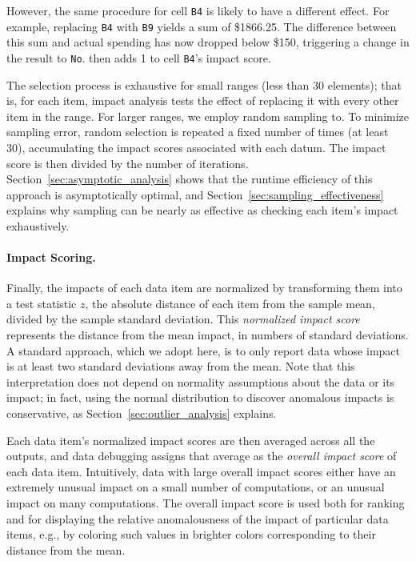 However, the same procedure for cell \texttt{B4} is likely to have a
different effect.  For example, replacing \texttt{B4}
with \texttt{B9} yields a sum of \$1866.25. The difference
between this sum and actual spending has now dropped below \$150,
triggering a change in the result to \texttt{No}. \checkcell{} then
adds 1 to cell \texttt{B4}'s impact score.


The selection process is exhaustive for small ranges (less than 30
elements); that is, for each item, impact analysis tests the effect of
replacing it with every other item in the range. For larger ranges, we
employ random sampling to.  To minimize sampling error, random
selection is repeated a fixed number of times (at least 30),
accumulating the impact scores associated with each datum. The impact
score is then divided by the number of
iterations. Section~\ref{sec:asymptotic_analysis} shows that the
runtime efficiency of this approach is asymptotically optimal, and
Section~\ref{sec:sampling_effectiveness} explains why sampling can be nearly as
effective as checking each item's impact exhaustively.

\paragraph{Impact Scoring.}
Finally, the impacts of each data item are normalized by transforming
them into a test statistic $z$, the absolute distance of
each item from the sample mean, divided by the sample standard
deviation. This \emph{normalized impact score} represents the distance
from the mean impact, in numbers of standard deviations. A standard
approach, which we adopt here, is to only report data whose impact is
at least two standard deviations away from the mean.  Note
that this interpretation does not depend on normality assumptions
about the data or its impact; in fact, using the normal distribution
to discover anomalous impacts is conservative, as
Section~\ref{sec:outlier_analysis} explains.

Each data item's normalized impact scores are then averaged across
all the outputs, and data debugging assigns that average as the
\emph{overall impact score} of each data item. Intuitively, data with
large overall impact scores either have an extremely unusual impact on a
small number of computations, or an unusual impact on many
computations. The overall impact score is used both for ranking and
for displaying the relative anomalousness of the impact of particular
data items, e.g., by coloring such values in brighter colors
corresponding to their distance from the mean.

